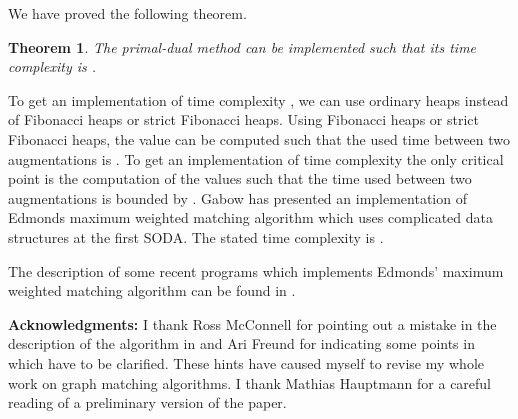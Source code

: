 \documentclass[12pt,twoside,a4paper]{article}
\newtheorem{theo}{Theorem}
\begin{document}
We have proved the following theorem.
\begin{theo}
The primal-dual method can be implemented such that its time complexity is .
\end{theo}
To get an implementation of time complexity , we can use ordinary heaps
instead of Fibonacci heaps or strict Fibonacci heaps. Using Fibonacci heaps or strict
Fibonacci heaps, the value  can be computed such that the used time between
two augmentations is . To get an implementation of time complexity
 the only critical point is the computation of the values 
such that the time used between two augmentations is bounded by .
Gabow \cite{Ga2} has presented an implementation of Edmonds maximum weighted matching 
algorithm which uses complicated data structures at the first SODA. The stated time 
complexity is .

The description of some recent programs which implements Edmonds' maximum weighted 
matching algorithm can be found in \cite{CoRo, MeSc, Ko}.

\medskip
\noindent
{\bf Acknowledgments:} 
I thank Ross McConnell for pointing out a mistake in the description of the
algorithm in \cite{Bl3} and Ari Freund for indicating some points in 
\cite{Bl2} which have to be clarified. These hints
have caused myself to revise my whole work on graph matching algorithms.
I thank Mathias Hauptmann for a careful reading of a preliminary version of the paper.
\end{document}

